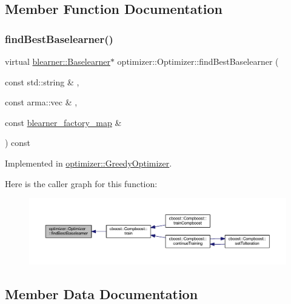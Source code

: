 \subsection{Member Function Documentation}
\mbox{\label{classoptimizer_1_1_optimizer_a134c7b34ed868231fbab53e9ebfa8fd8}} 
\subsubsection{\texorpdfstring{find\+Best\+Baselearner()}{findBestBaselearner()}}
{\footnotesize\ttfamily virtual \hyperlink{classblearner_1_1_baselearner}{blearner\+::\+Baselearner}$\ast$ optimizer\+::\+Optimizer\+::find\+Best\+Baselearner (\begin{DoxyParamCaption}\item[{const std\+::string \&}]{,  }\item[{const arma\+::vec \&}]{,  }\item[{const \hyperlink{baselearner__factory__list_8h_a058570e00ae11b882cfed36eb40be025}{blearner\+\_\+factory\+\_\+map} \&}]{ }\end{DoxyParamCaption}) const\hspace{0.3cm}{\ttfamily [pure virtual]}}



Implemented in \hyperlink{classoptimizer_1_1_greedy_optimizer_adc36d8a0082dc065fc1340869d36069d}{optimizer\+::\+Greedy\+Optimizer}.

Here is the caller graph for this function\+:\nopagebreak
\begin{figure}[H]
\begin{center}
\leavevmode
\includegraphics[width=350pt]{classoptimizer_1_1_optimizer_a134c7b34ed868231fbab53e9ebfa8fd8_icgraph}
\end{center}
\end{figure}


\subsection{Member Data Documentation}
\mbox{\label{classoptimizer_1_1_optimizer_a93f8af0ef81986bc208cab5e3cc2ba31}} 
